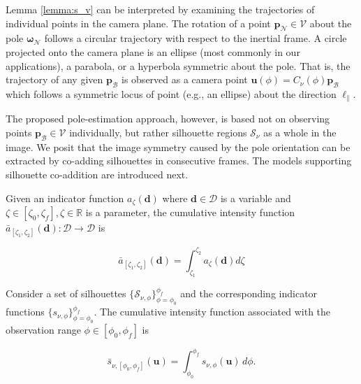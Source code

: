 Lemma \ref{lemma:s_v} can be interpreted by examining the trajectories of individual points in the camera plane. The rotation of a point $\mathbf{p}_\mathcal{N}\in\mathcal{V}$ about the pole $\boldsymbol{\omega}_\mathcal{N}$ follows a circular trajectory with respect to the inertial frame. A circle projected onto the camera plane is an ellipse (most commonly in our applications), a parabola, or a hyperbola symmetric about the pole. That is, the trajectory of any given $\mathbf{p}_\mathcal{B}$ is observed as a camera point $\mathbf{u}(\phi)=C_\nu(\phi) \mathbf{p}_\mathcal{B}$ which follows a symmetric locus of point (e.g., an ellipse) about the direction $\ell_\parallel$.

The proposed pole-estimation approach, however, is based not on observing points $\mathbf{p}_\mathcal{B}\in\mathcal{V}$ individually, but rather silhouette regions $\mathcal{S}_\nu$ as a whole in the image. We posit that the image symmetry caused by the pole orientation can be extracted by co-adding silhouettes in consecutive frames. The models supporting silhouette co-addition are introduced next.

\begin{definition}
    Given an indicator function $a_\zeta(\mathbf{d})$ where $\mathbf{d}\in \mathcal{D}$ is a variable and $\zeta \in [\zeta_0,\zeta_f],\zeta \in \mathbb{R}$ is a parameter, the cumulative intensity function $\bar{a}_{[\zeta_1,\zeta_2]}(\mathbf{d}):\mathcal{D} \rightarrow \mathcal{D}$ is

    \begin{equation}
        \bar{a}_{[\zeta_1,\zeta_2]}(\mathbf{d}) = \int_{\zeta_1}^{\zeta_2} a_\zeta(\mathbf{d}) d\zeta
    \end{equation}
    
\end{definition}

\begin{definition}
    \label{def:s_bar_v}
    Consider a set of silhouettes $\{ \mathcal{S}_{\nu,\phi} \}_{\phi=\phi_0}^{\phi_f}$ and the corresponding indicator functions $\{ s_{\nu,\phi} \}_{\phi=\phi_0}^{\phi_f}$. The cumulative intensity function associated with the observation range $\phi \in [\phi_0, \phi_f]$ is

    \begin{equation}
    \label{eq:s_bar}
        \bar{s}_{\nu,[\phi_0,\phi_f]}(\mathbf{u}) = \int_{\phi_0}^{\phi_f} s_{\nu,\phi}(\mathbf{u})\, d\phi.
    \end{equation}
\end{definition}

